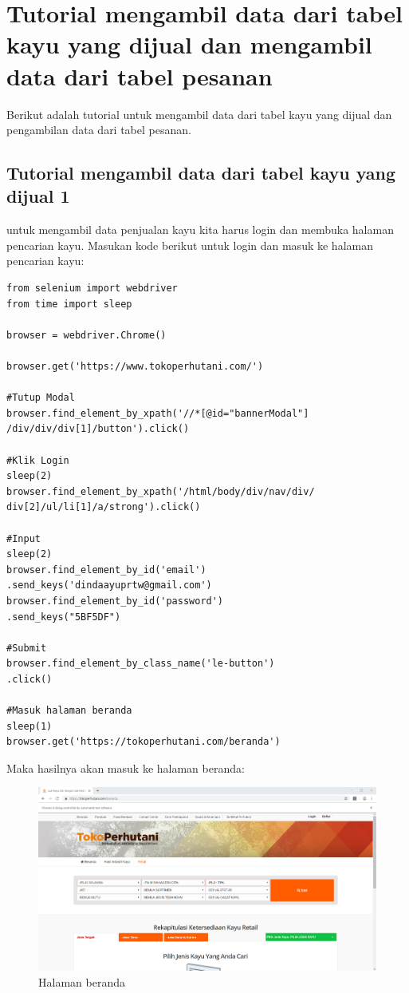 \newpage
\section{Tutorial mengambil data dari tabel kayu yang dijual dan mengambil data dari tabel pesanan}
Berikut adalah tutorial untuk  mengambil data dari tabel kayu yang dijual dan pengambilan data dari tabel pesanan. 

\subsection{Tutorial mengambil data dari tabel kayu yang dijual 1}
untuk mengambil data penjualan kayu kita harus login dan membuka halaman pencarian kayu.
Masukan kode berikut untuk login dan masuk ke halaman pencarian kayu:
\begin{verbatim}
from selenium import webdriver
from time import sleep

browser = webdriver.Chrome()

browser.get('https://www.tokoperhutani.com/')

#Tutup Modal
browser.find_element_by_xpath('//*[@id="bannerModal"]
/div/div/div[1]/button').click()

#Klik Login
sleep(2)
browser.find_element_by_xpath('/html/body/div/nav/div/
div[2]/ul/li[1]/a/strong').click()

#Input 
sleep(2)
browser.find_element_by_id('email')
.send_keys('dindaayuprtw@gmail.com')
browser.find_element_by_id('password')
.send_keys("5BF5DF")

#Submit
browser.find_element_by_class_name('le-button')
.click()

#Masuk halaman beranda
sleep(1)
browser.get('https://tokoperhutani.com/beranda')
\end{verbatim}
\newpage
Maka hasilnya akan masuk ke halaman beranda:
\begin{figure}[h]
	\centering
	\includegraphics[scale=0.30]{figures/7beranda}
	\caption{Halaman beranda}
\end{figure}

